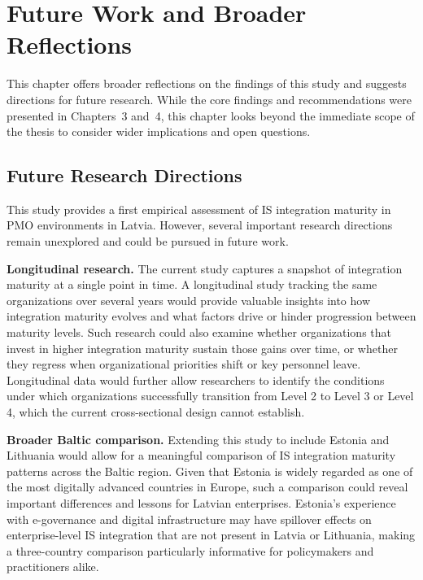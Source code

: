 \chapter{Future Work and Broader Reflections}
\label{chap:optional-discussion}

This chapter offers broader reflections on the findings of this study
and suggests directions for future research. While the core findings
and recommendations were presented in Chapters~3 and~4, this chapter
looks beyond the immediate scope of the thesis to consider wider
implications and open questions.

\section{Future Research Directions}
\label{sec:future}

This study provides a first empirical assessment of IS integration
maturity in PMO environments in Latvia. However, several important
research directions remain unexplored and could be pursued in
future work.

\textbf{Longitudinal research.} The current study captures a snapshot
of integration maturity at a single point in time. A longitudinal
study tracking the same organizations over several years would provide
valuable insights into how integration maturity evolves and what
factors drive or hinder progression between maturity levels. Such
research could also examine whether organizations that invest in
higher integration maturity sustain those gains over time, or whether
they regress when organizational priorities shift or key personnel
leave. Longitudinal data would further allow researchers to identify
the conditions under which organizations successfully transition from
Level 2 to Level 3 or Level 4, which the current cross-sectional
design cannot establish.

\textbf{Broader Baltic comparison.} Extending this study to include
Estonia and Lithuania would allow for a meaningful comparison of IS
integration maturity patterns across the Baltic region. Given that
Estonia is widely regarded as one of the most digitally advanced
countries in Europe, such a comparison could reveal important
differences and lessons for Latvian enterprises. Estonia's experience
with e-governance and digital infrastructure may have spillover
effects on enterprise-level IS integration that are not present in
Latvia or Lithuania, making a three-country comparison particularly
informative for policymakers and practitioners alike.

